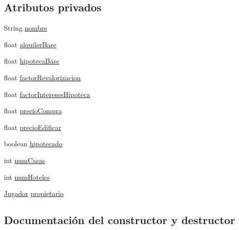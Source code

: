 \subsection*{Atributos privados}
\begin{DoxyCompactItemize}
\item 
String \hyperlink{classcivitas_1_1TituloPropiedad_a7542ca29c4635b8cb3c56558ed7c5096}{nombre}
\item 
float \hyperlink{classcivitas_1_1TituloPropiedad_ad372303cdfec1ef367ce5173b4cf190f}{alquiler\+Base}
\item 
float \hyperlink{classcivitas_1_1TituloPropiedad_a9fd4c960de937e9a153cb476db54d2f5}{hipoteca\+Base}
\item 
float \hyperlink{classcivitas_1_1TituloPropiedad_a0c3ef08d921d8a6590f5235c17fe6cb5}{factor\+Revalorizacion}
\item 
float \hyperlink{classcivitas_1_1TituloPropiedad_abd6ce22a95527549a5d16c8d7b9fe7c4}{factor\+Intereses\+Hipoteca}
\item 
float \hyperlink{classcivitas_1_1TituloPropiedad_acdc775162906323868c955a513a34848}{precio\+Compra}
\item 
float \hyperlink{classcivitas_1_1TituloPropiedad_a6f7132689ac8d0d38d265549b6077d69}{precio\+Edificar}
\item 
boolean \hyperlink{classcivitas_1_1TituloPropiedad_a9b42e0a643175ab81ad9a445e515fce5}{hipotecado}
\item 
int \hyperlink{classcivitas_1_1TituloPropiedad_a283d2db60950387513a6d9d80cf5d675}{num\+Casas}
\item 
int \hyperlink{classcivitas_1_1TituloPropiedad_a465cc28df575da44a07767cefcfa877c}{num\+Hoteles}
\item 
\hyperlink{classcivitas_1_1Jugador}{Jugador} \hyperlink{classcivitas_1_1TituloPropiedad_a6731d7d3651671b0d385724c209e25b7}{propietario}
\end{DoxyCompactItemize}


\subsection{Documentación del constructor y destructor}
\mbox{\label{classcivitas_1_1TituloPropiedad_ace9e509977e1a3df5ee0cab4cc150622}} 
